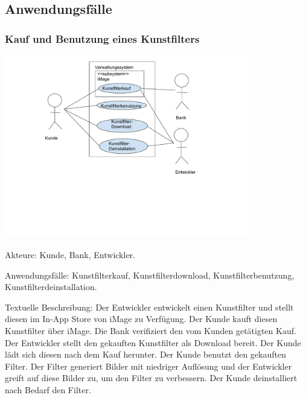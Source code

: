 \documentclass[parskip=full]{scrartcl}
\begin{document}
\subsection{Anwendungsfälle}
\subsubsection{Kauf und Benutzung eines Kunstfilters}
\begin{center}
\includegraphics[width=0.8\textwidth]{szenario_iMage_als_Kunstfilterapp.pdf}
\end{center}

Akteure: \gls{Kunde}, \gls{Bank}, \gls{Entwickler}.

Anwendungsfälle: Kunstfilterkauf, Kunstfilterdownload, Kunstfilterbenutzung, Kunstfilterdeinstallation.

Textuelle Beschreibung:
Der Entwickler entwickelt einen Kunstfilter und stellt diesen im \gls{In-App Store} von iMage zu Verfügung. Der Kunde kauft diesen Kunstfilter über iMage. Die Bank verifiziert den vom Kunden getätigten Kauf.
Der Entwickler stellt den gekauften Kunstfilter als Download bereit. Der Kunde lädt sich diesen nach dem Kauf herunter.
Der Kunde benutzt den gekauften Filter. Der Filter generiert Bilder mit niedriger Auflösung und der Entwickler greift auf diese Bilder zu, um den Filter zu verbessern.
Der Kunde deinstalliert nach Bedarf den Filter.


%
%

\printnoidxglossaries
\end{document}
